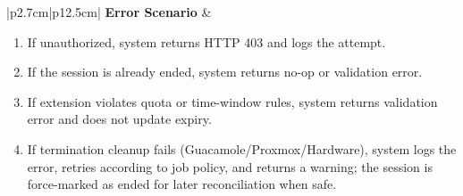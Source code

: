 \begin{table}[H]
\begin{tabular}{|p{2.7cm}|p{12.5cm}|}
\textbf{Error Scenario} &
\begin{minipage}[t]{\linewidth}
\begin{enumerate}[topsep=0pt,itemsep=1pt,parsep=0pt,partopsep=0pt]
\item If unauthorized, system returns HTTP 403 and logs the attempt.
\item If the session is already ended, system returns no-op or validation error.
\item If extension violates quota or time-window rules, system returns validation error and does not update expiry.
\item If termination cleanup fails (Guacamole/Proxmox/Hardware), system logs the error, retries according to job policy, and returns a warning; the session is force-marked as ended for later reconciliation when safe.
\end{enumerate}
\end{minipage} \\ \hline

\end{tabular}
\label{tab:admin-manage-sessions}
\end{table}











































\iffalse

